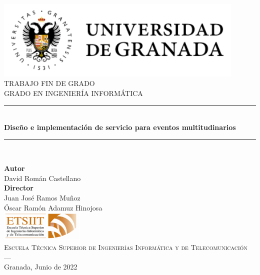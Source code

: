 \begin{titlepage}
\newlength{\centeroffset}
\setlength{\centeroffset}{-0.5\oddsidemargin}
\addtolength{\centeroffset}{0.5\evensidemargin}
\thispagestyle{empty}

\noindent\hspace*{\centeroffset}\begin{minipage}{\textwidth}

\centering
\includegraphics[width=0.9\textwidth]{logos/LogoUGR.png}\\[1.4cm]

\textsc{ \Large TRABAJO FIN DE GRADO\\[0.2cm]}
\textsc{ GRADO EN INGENIERÍA INFORMÁTICA}\\[1cm]

\noindent\rule[-2ex]{\textwidth}{3pt}\\[3ex]
{\Huge\bfseries Diseño e implementación de servicio para eventos multitudinarios \\}
\noindent\rule[0ex]{\textwidth}{3pt}\\[3ex]
{\large\bfseries  }
\end{minipage}

\vspace{0.7cm}
\noindent\hspace*{\centeroffset}
\begin{minipage}{\textwidth}
\centering

\textbf{Autor}\\ {David Román Castellano}\\[2.5ex]
\textbf{Director}\\ {Juan José Ramos Muñoz \\ Óscar Ramón Adamuz Hinojosa
}\\[2cm]
\includegraphics[width=0.3\textwidth]{logos/etsiit_logo.png}\\[0.1cm]
\textsc{Escuela Técnica Superior de Ingenierías Informática y de Telecomunicación}\\
\textsc{---}\\
Granada, Junio de 2022
\end{minipage}
\end{titlepage}
